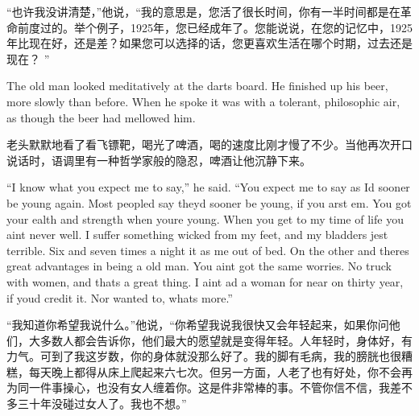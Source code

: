 \begin{paracol}{2}
\switchcolumn

``也许我没讲清楚，''他说，``我的意思是，您活了很长时间，你有一半时间都是在革命前度过的。举个例子，1925年，您已经成年了。您能说说，在您的记忆中，1925年比现在好，还是差？如果您可以选择的话，您更喜欢生活在哪个时期，过去还是现在？
''

\switchcolumn*

The old man looked meditatively at the darts board. He finished up his
beer, more slowly than before. When he spoke it was with a tolerant,
philosophic air, as though the beer had mellowed him.

\switchcolumn

老头默默地看了看飞镖靶，喝光了啤酒，喝的速度比刚才慢了不少。当他再次开口说话时，语调里有一种哲学家般的隐忍，啤酒让他沉静下来。

\switchcolumn*

``I know what you expect me to say,'' he said. ``You expect me to say as
I\textquotesingle d sooner be young again. Most people\textquotesingle d
say they\textquotesingle d sooner be young, if you arst
\textquotesingle em. You got your \textquotesingle ealth and strength
when you\textquotesingle re young. When you get to my time of life you
ain\textquotesingle t never well. I suffer something wicked from my
feet, and my bladder\textquotesingle s jest terrible. Six and seven
times a night it \textquotesingle as me out of bed. On the other
\textquotesingle and there\textquotesingle s great advantages in being a
old man. You ain\textquotesingle t got the same worries. No truck with
women, and that\textquotesingle s a great thing. I ain\textquotesingle t
\textquotesingle ad a woman for near on thirty year, if
you\textquotesingle d credit it. Nor wanted to, what\textquotesingle s
more.''

\switchcolumn

``我知道你希望我说什么。''他说，``你希望我说我很快又会年轻起来，如果你问他们，大多数人都会告诉你，他们最大的愿望就是变得年轻。人年轻时，身体好，有力气。可到了我这岁数，你的身体就没那么好了。我的脚有毛病，我的膀胱也很糟糕，每天晚上都得从床上爬起来六七次。但另一方面，人老了也有好处，你不会再为同一件事操心，也没有女人缠着你。这是件非常棒的事。不管你信不信，我差不多三十年没碰过女人了。我也不想。''

\switchcolumn*


\end{paracol}

